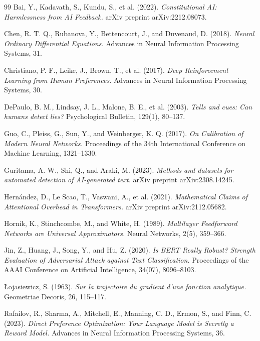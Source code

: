 \documentclass[12pt,oneside]{article}
\begin{document}
{{{{{{{{{{{\begin{thebibliography}{99}
Bai, Y., Kadavath, S., Kundu, S., et al. (2022).
 \textit{Constitutional AI: Harmlessness from AI Feedback.}
 arXiv preprint arXiv:2212.08073.

Chen, R. T. Q., Rubanova, Y., Bettencourt, J., and Duvenaud, D. (2018).
 \textit{Neural Ordinary Differential Equations.}
 Advances in Neural Information Processing Systems, 31.

Christiano, P. F., Leike, J., Brown, T., et al. (2017).
 \textit{Deep Reinforcement Learning from Human Preferences.}
 Advances in Neural Information Processing Systems, 30.

DePaulo, B. M., Lindsay, J. L., Malone, B. E., et al. (2003).
 \textit{Tells and cues: Can humans detect lies?}
 Psychological Bulletin, 129(1), 80--137.

Guo, C., Pleiss, G., Sun, Y., and Weinberger, K. Q. (2017).
 \textit{On Calibration of Modern Neural Networks.}
 Proceedings of the 34th International Conference on Machine Learning, 1321--1330.

Guritama, A. W., Shi, Q., and Araki, M. (2023).
 \textit{Methods and datasets for automated detection of AI-generated text.}
 arXiv preprint arXiv:2308.14245.

Hernández, D., Le Scao, T., Vaswani, A., et al. (2021).
 \textit{Mathematical Claims of Attentional Overhead in Transformers.}
 arXiv preprint arXiv:2112.05682.

Hornik, K., Stinchcombe, M., and White, H. (1989).
 \textit{Multilayer Feedforward Networks are Universal Approximators.}
 Neural Networks, 2(5), 359--366.

Jin, Z., Huang, J., Song, Y., and Hu, Z. (2020).
 \textit{Is BERT Really Robust? Strength Evaluation of Adversarial Attack against Text Classification.}
 Proceedings of the AAAI Conference on Artificial Intelligence, 34(07), 8096--8103.

Łojasiewicz, S. (1963).
 \textit{Sur la trajectoire du gradient d'une fonction analytique.}
 Geometriae Decoris, 26, 115--117.

Rafailov, R., Sharma, A., Mitchell, E., Manning, C. D., Ermon, S., and Finn, C. (2023).
 \textit{Direct Preference Optimization: Your Language Model is Secretly a Reward Model.}
 Advances in Neural Information Processing Systems, 36.


\end{thebibliography}}}}}}}}}}}}
\end{document}
